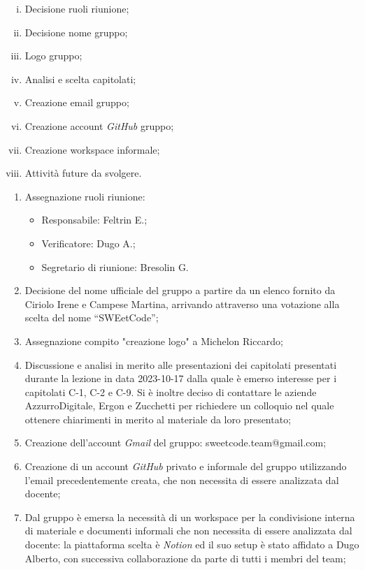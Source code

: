 \documentclass{article}
\begin{document}
\begin{paracol}{2}
\begin{enumerate}[i.]
    \item Decisione ruoli riunione;
    \item Decisione nome gruppo;
    \item Logo gruppo;
    \item Analisi e scelta capitolati;
    \item Creazione email gruppo;
    \item Creazione account \textit{GitHub} gruppo;
    \item Creazione workspace informale;
    \item Attività future da svolgere.
\end{enumerate}

\newpage

\begin{enumerate}
    \item Assegnazione ruoli riunione:
    \begin{itemize}
        \item Responsabile: Feltrin E.;
        \item Verificatore: Dugo A.;
        \item Segretario di riunione: Bresolin G.
    \end{itemize}
    \item Decisione del nome ufficiale del gruppo a partire da un elenco fornito da Ciriolo Irene e Campese Martina, arrivando attraverso una votazione alla scelta del nome “SWEetCode”;
    \item Assegnazione compito "creazione logo" a Michelon Riccardo;
    \item Discussione e analisi in merito alle presentazioni dei capitolati presentati durante la lezione in data 2023-10-17 dalla quale è emerso interesse per i capitolati C-1, C-2 e C-9. Si è inoltre deciso di contattare le aziende AzzurroDigitale, Ergon e Zucchetti per richiedere un colloquio nel quale ottenere chiarimenti in merito al materiale da loro presentato;
    \item Creazione dell’account \textit{Gmail} del gruppo:
    sweetcode.team@gmail.com;
    \item Creazione di un account \textit{GitHub} privato e informale del gruppo utilizzando l'email precedentemente creata, che non necessita di essere analizzata dal docente;
    \item Dal gruppo è emersa la necessità di un workspace per la condivisione interna di materiale e documenti informali che non necessita di essere analizzata dal docente: la piattaforma scelta è \textit{Notion} ed il suo setup è stato affidato a Dugo Alberto, con successiva collaborazione da parte di tutti i membri del team;

\end{enumerate}
\end{paracol}
\end{document}
